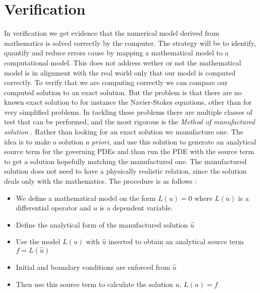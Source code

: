 \section*{Verification}
In verification we get evidence that the numerical model derived from mathematics is solved correctly by the computer. The strategy will be to identify, quantify and reduce errors cause by mapping a mathematical model to a computational model. This does not address wether or not the mathematical model is in alignment with the real world only that our model is computed correctly. To verify that we are computing correctly we can compare our computed solution to an exact solution. But the problem is that there are no known exact solution to for instance the Navier-Stokes equations, other than for very simplified problems.
In tackling these problems there are multiple classes of test that can be performed, and the most rigorous is the \textit{Method of manufactured solution} \cite{Oberkampf2010}. Rather than looking for an exact solution we manufacture one. The idea is to make a solution \textit{a priori},  and use this solution to generate an analytical source term for the governing PDEs and than run the PDE with the source term to get a solution hopefully matching the manufactured one. The manufactured solution does not need to have a physically realistic relation, since the solution deals only with the mathematics. 
The procedure is as follows \cite{Oberkampf2010}:
\begin{itemize}
\item We define a mathematical model on the form $ L(u) = 0$ where $L(u)$ is a differential operator and $u$ is a dependent variable.
\item Define the analytical form of the manufactured solution $\hat{u}$
\item Use the model $L(u)$ with $\hat{u}$ inserted to obtain an analytical source term $ f = L(\hat{u}) $
\item Initial and boundary conditions are enforced from $\hat{u}$
\item Then use this source term to calculate the solution $u$, $L(u) = f $
\end{itemize}


